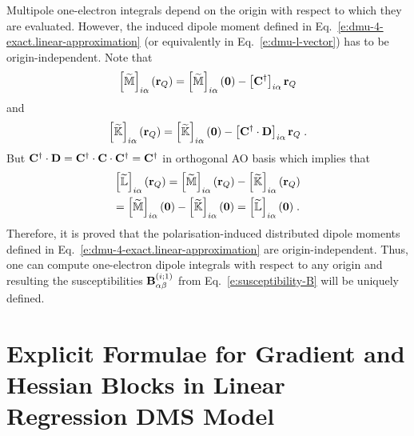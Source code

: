 \documentclass[aip,amsmath,amssymb,reprint,floatfix]{revtex4-1}
\begin{document}
Multipole one\hyp{}electron integrals depend on the origin with respect to which they are evaluated.
However, the induced dipole moment defined in Eq.~\eqref{e:dmu-4-exact.linear-approximation} 
(or equivalently in Eq.~\eqref{e:dmu-l-vector})
has to be origin\hyp{}independent. Note that
%
\begin{equation}
 \left[ \widetilde{\mathbb{M}} \right]_{i\alpha} ({\bf r}_Q) 
 = \left[ \widetilde{\mathbb{M}} \right]_{i\alpha} ({\bf 0}) - \left[ {\bf C}^\dagger \right]_{i\alpha} {\bf r}_Q  
\end{equation}
%
and
%
\begin{equation}
 \left[ \widetilde{\mathbb{K}} \right]_{i\alpha} ({\bf r}_Q) 
 = \left[ \widetilde{\mathbb{K}} \right]_{i\alpha} ({\bf 0}) - \left[ {\bf C}^\dagger \cdot {\bf D} \right]_{i\alpha} {\bf r}_Q \;.
\end{equation}
%
But ${\bf C}^\dagger \cdot {\bf D}={\bf C}^\dagger \cdot {\bf C} \cdot {\bf C}^\dagger={\bf C}^\dagger$ in orthogonal
AO basis which implies that
%
\begin{multline}
   \left[ \widetilde{\mathbb{L}} \right]_{i\alpha} ({\bf r}_Q) 
 = \left[ \widetilde{\mathbb{M}} \right]_{i\alpha} ({\bf r}_Q) 
 - \left[ \widetilde{\mathbb{K}} \right]_{i\alpha} ({\bf r}_Q) \\
 = \left[ \widetilde{\mathbb{M}} \right]_{i\alpha} ({\bf 0})   
 - \left[ \widetilde{\mathbb{K}} \right]_{i\alpha} ({\bf 0})
 = \left[ \widetilde{\mathbb{L}} \right]_{i\alpha} ({\bf 0}) \;.
\end{multline}
%
Therefore, it is proved that the polarisation\hyp{}induced distributed dipole moments 
defined in Eq.~\eqref{e:dmu-4-exact.linear-approximation} are origin\hyp{}independent.
Thus, one can compute one\hyp{}electron dipole integrals with respect to any origin 
and resulting the susceptibilities ${\bf B}_{\alpha\beta}^{(i;1)}$ 
from Eq.~\eqref{e:susceptibility-B} will be uniquely defined.

\section{\label{a:blocks} Explicit Formulae for Gradient and Hessian Blocks in Linear Regression DMS Model}
\end{document}
